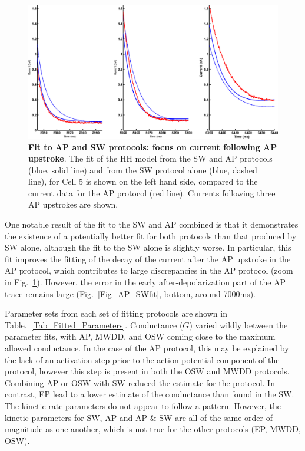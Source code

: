\documentclass[11pt,a4paper,oneside]{article}
\begin{document}
\begin{figure}[hb]
\begin{center}
\includegraphics[scale=0.42]{Figures/Fig_hh_16713110_FP_ap_sine_wave_CP_ap_zoom.png}
\caption{\textbf{Fit to AP and SW protocols: focus on current following AP upstroke}. The fit of the HH model from the SW and AP protocols (blue, solid line) and from the SW protocol alone (blue, dashed line), for Cell 5 is shown on the left hand side, compared to the current data for the AP protocol (red line). Currents following three AP upstrokes are shown.} 
\label{Fig_AP_SWzoomfit}
\end{center}
\end{figure}

One notable result of the fit to the SW and AP combined is that it demonstrates the existence of a potentially better fit for both protocols than that produced by SW alone, although the fit to the SW alone is slightly worse. In particular, this fit improves the fitting of the decay of the current after the AP upstroke in the AP protocol, which contributes to large discrepancies in the AP protocol (zoom in Fig.~\ref{Fig_AP_SWzoomfit}). However, the error in the early after-depolarization part of the AP trace remains large (Fig.~\ref{Fig_AP_SWfit}, bottom, around 7000ms).

Parameter sets from each set of fitting protocols are shown in Table.~\ref{Tab_Fitted_Parameters}. Conductance ($G$) varied wildly between the parameter fits, with AP, MWDD, and OSW coming close to the maximum allowed conductance. In the case of the AP protocol, this may be explained by the lack of an activation step prior to the action potential component of the protocol, however this step is present in both the OSW and MWDD protocols. Combining AP or OSW with SW reduced the estimate for the protocol. In contrast, EP lead to a lower estimate of the conductance than found in the SW. The kinetic rate parameters do not appear to follow a pattern. However, the kinetic parameters for SW, AP and AP \& SW are all of the same order of magnitude as one another, which is not true for the other protocols (EP, MWDD, OSW).
\end{document}
